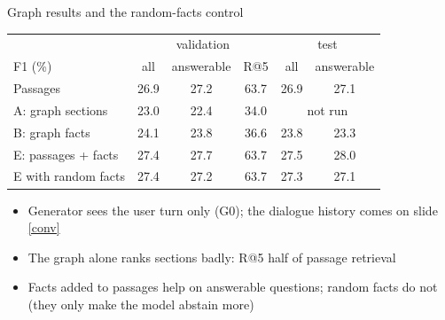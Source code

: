 \documentclass[aspectratio=169,11pt]{beamer}
\newcommand{\up}[1]{{\color{green!45!black}#1}}
\newcommand{\down}[1]{{\color{accent}#1}}
\begin{document}
\begin{frame}{Graph results and the random-facts control}
\centering
\small
\begin{tabular}{lccccc}
\toprule
& \multicolumn{3}{c}{validation} & \multicolumn{2}{c}{test} \\
F1 (\%) & all & answerable & R@5 & all & answerable \\
\midrule
Passages & 26.9 & 27.2 & 63.7 & 26.9 & 27.1 \\ %
A: graph sections & \down{23.0} & 22.4 & 34.0 & \multicolumn{2}{c}{\footnotesize not run} \\ %
B: graph facts & \down{24.1} & 23.8 & 36.6 & 23.8 & 23.3 \\ %
E: passages + facts & 27.4 & \up{27.7} & 63.7 & 27.5 & \up{28.0} \\ %
E with random facts & 27.4 & 27.2 & 63.7 & 27.3 & 27.1 \\ %
\bottomrule
\end{tabular}

\vspace{4mm}
\begin{itemize}
\item Generator sees the user turn only (G0); the dialogue history comes on slide \ref{conv}
\item The graph alone ranks sections badly: R@5 half of passage retrieval
\item Facts added to passages help on answerable questions; random facts do not (they only make the model abstain more)
\end{itemize}
\end{frame}
\end{document}
